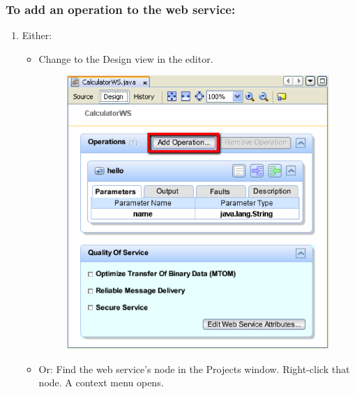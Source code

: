 \subsubsection{To add an operation to the web service:}
\begin{enumerate}
\item Either:
\begin{itemize}
\item Change to the Design view in the editor.

\begin{figure}
\begin{center}
\includegraphics[scale=1]{J2}
\label{J2}
\end{center}
\end{figure}

\item Or: Find the web service's node in the Projects window. Right-click that node. A context menu opens.


\end{itemize}
\end{enumerate}
